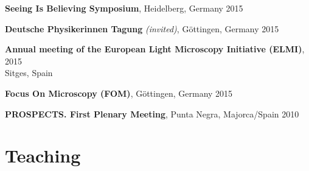 \documentclass[margin,line]{res}
\begin{document}
\begin{resume}
\vspace*{-2.5mm}
{\bf Seeing Is Believing Symposium}, Heidelberg, Germany \hfill 2015%

\vspace*{-2.5mm}
{\bf Deutsche Physikerinnen Tagung} {\it (invited)}, Göttingen, Germany \hfill 2015%

\vspace*{-2.5mm}
{\bf Annual meeting of the European Light Microscopy Initiative (ELMI)},  \hfill 2015\\Sitges, Spain%

\vspace*{-2.5mm}
{\bf Focus On Microscopy (FOM)}, Göttingen, Germany  \hfill 2015%

\vspace*{-2.5mm}
{\bf PROSPECTS. First Plenary Meeting}, Punta Negra, Majorca/Spain  \hfill 2010 %


\section{\sc Teaching}



\end{resume}
\end{document}
